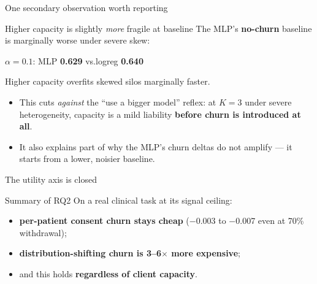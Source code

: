 \documentclass[aspectratio=169, 11pt]{beamer}
\begin{document}
\begin{frame}{One secondary observation worth reporting}
\begin{block}{Higher capacity is slightly \emph{more} fragile at baseline}
The MLP's \textbf{no-churn} baseline is marginally worse under severe skew:
\begin{center}\small
$\alpha{=}0.1$: \quad MLP \textbf{0.629} \quad vs.\quad logreg \textbf{0.640}
\end{center}
Higher capacity overfits skewed silos marginally faster.
\end{block}
\vspace{0.7em}
\begin{itemize}
\item This cuts \emph{against} the ``use a bigger model'' reflex: at
      $K{=}3$ under severe heterogeneity, capacity is a mild liability
      \textbf{before churn is introduced at all}.
\item It also explains part of why the MLP's churn deltas do not amplify ---
      it starts from a lower, noisier baseline.
\end{itemize}
\end{frame}

\begin{frame}{The utility axis is closed}
\begin{exampleblock}{Summary of RQ2}
On a real clinical task at its signal ceiling:
\begin{itemize}
\item \textbf{per-patient consent churn stays cheap} ($-$0.003 to $-$0.007
      even at 70\% withdrawal);
\item \textbf{distribution-shifting churn is 3--6$\times$ more expensive};
\item and this holds \textbf{regardless of client capacity}.
\end{itemize}
\end{exampleblock}
\vspace{0.7em}
\begin{center}
\end{center}
\end{frame}
\end{document}
